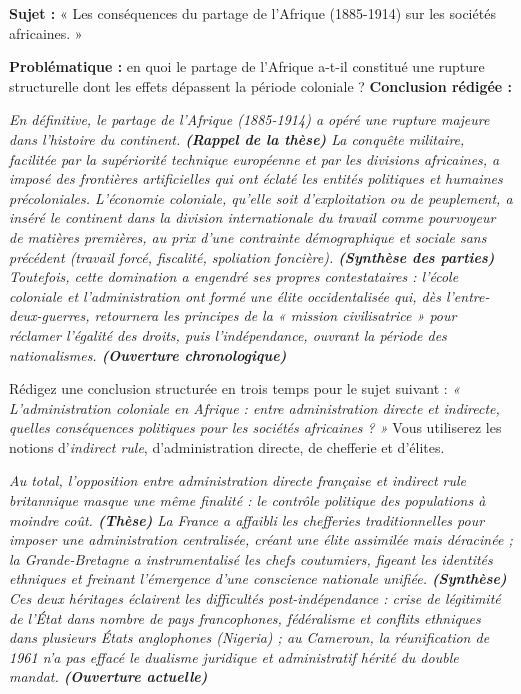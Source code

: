 \documentclass[11pt]{article}
\begin{document}
\begin{exoresolu}
\textbf{Sujet :} « Les conséquences du partage de l'Afrique (1885-1914) sur les sociétés africaines. »

\textbf{Problématique :} en quoi le partage de l'Afrique a-t-il constitué une rupture structurelle dont les effets dépassent la période coloniale ?
\tcblower
\textbf{Conclusion rédigée :}

\emph{En définitive, le partage de l'Afrique (1885-1914) a opéré une rupture majeure dans l'histoire du continent. \textbf{(Rappel de la thèse)} La conquête militaire, facilitée par la supériorité technique européenne et par les divisions africaines, a imposé des frontières artificielles qui ont éclaté les entités politiques et humaines précoloniales. L'économie coloniale, qu'elle soit d'exploitation ou de peuplement, a inséré le continent dans la division internationale du travail comme pourvoyeur de matières premières, au prix d'une contrainte démographique et sociale sans précédent (travail forcé, fiscalité, spoliation foncière). \textbf{(Synthèse des parties)} Toutefois, cette domination a engendré ses propres contestataires : l'école coloniale et l'administration ont formé une élite occidentalisée qui, dès l'entre-deux-guerres, retournera les principes de la « mission civilisatrice » pour réclamer l'égalité des droits, puis l'indépendance, ouvrant la période des nationalismes. \textbf{(Ouverture chronologique)}}
\end{exoresolu}

\begin{exercice}
Rédigez une conclusion structurée en trois temps pour le sujet suivant : \emph{« L'administration coloniale en Afrique : entre administration directe et indirecte, quelles conséquences politiques pour les sociétés africaines ? »} Vous utiliserez les notions d'\emph{indirect rule}, d'administration directe, de chefferie et d'élites.
\end{exercice}

\begin{corrige}
\emph{Au total, l'opposition entre administration directe française et \emph{indirect rule} britannique masque une même finalité : le contrôle politique des populations à moindre coût. \textbf{(Thèse)} La France a affaibli les chefferies traditionnelles pour imposer une administration centralisée, créant une élite assimilée mais déracinée ; la Grande-Bretagne a instrumentalisé les chefs coutumiers, figeant les identités ethniques et freinant l'émergence d'une conscience nationale unifiée. \textbf{(Synthèse)} Ces deux héritages éclairent les difficultés post-indépendance : crise de légitimité de l'État dans nombre de pays francophones, fédéralisme et conflits ethniques dans plusieurs États anglophones (Nigeria) ; au Cameroun, la réunification de 1961 n'a pas effacé le dualisme juridique et administratif hérité du double mandat. \textbf{(Ouverture actuelle)}}
\end{corrige}
\end{document}
